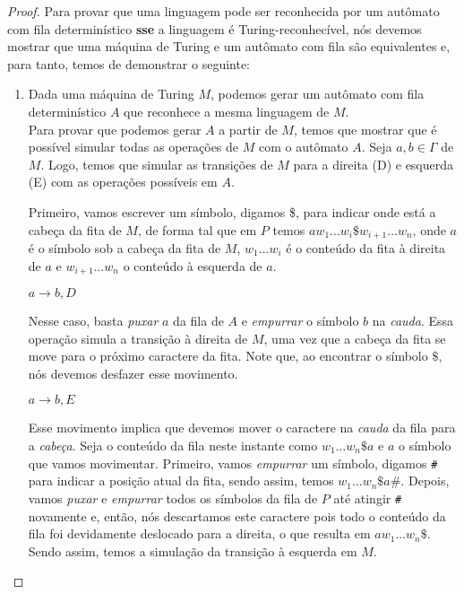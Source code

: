 \begin{proof}
Para provar que uma linguagem pode ser reconhecida por um autômato com fila determinístico \textbf{sse} a linguagem é Turing-reconhecível, nós devemos mostrar que uma máquina de Turing e um autômato com fila são equivalentes e, para tanto, temos de demonstrar o seguinte:
\begin{enumerate}
\item Dada uma máquina de Turing $M$, podemos gerar um autômato com fila determinístico $A$ que reconhece a mesma linguagem de $M$.\\[3pt]
Para provar que podemos gerar $A$ a partir de $M$, temos que mostrar que é possível simular todas as operações de $M$ com o autômato $A$. Seja $a, b \in \Gamma$ de $M$. Logo, temos que simular as transições de $M$ para a direita (D) e esquerda (E) com as operações possíveis em $A$.

Primeiro, vamos escrever um símbolo, digamos \$, para indicar onde está a cabeça da fita de $M$, de forma tal que em $P$ temos $aw_1 \ldots  w_i\$w_{i+1} \ldots w_n$, onde $a$ é o símbolo sob a cabeça da fita de $M$, $w_1 \ldots w_i$ é o conteúdo da fita à direita de $a$ e $w_{i+1} \ldots w_n$ o conteúdo à esquerda de $a$.

$a \rightarrow b, D$

Nesse caso, basta \textit{puxar} $a$ da fila de $A$ e \textit{empurrar} o símbolo $b$ na \textit{cauda}. Essa operação simula a transição à direita de $M$, uma vez que a cabeça da fita se move para o próximo caractere da fita. Note que, ao encontrar o símbolo $\$$, nós devemos desfazer esse movimento.

$a \rightarrow b, E$

Esse movimento implica que devemos mover o caractere na \textit{cauda} da fila para a \textit{cabeça}.
Seja o conteúdo da fila neste instante como $w_1 \ldots  w_n\$a$ e $a$ o símbolo que vamos movimentar. Primeiro, vamos \textit{empurrar} um símbolo, digamos \texttt{\#} para indicar a posição atual da fita, sendo assim, temos $w_1 \ldots  w_n\$a\texttt{\#}$. Depois, vamos \textit{puxar} e \textit{empurrar} todos os símbolos da fila de $P$ até atingir \texttt{\#} novamente e, então, nós descartamos este caractere pois todo o conteúdo da fila foi devidamente deslocado para a direita, o que resulta em $aw_1 \ldots  w_n\$$. Sendo assim, temos a simulação da transição à esquerda em $M$.


\end{enumerate}
\end{proof}
